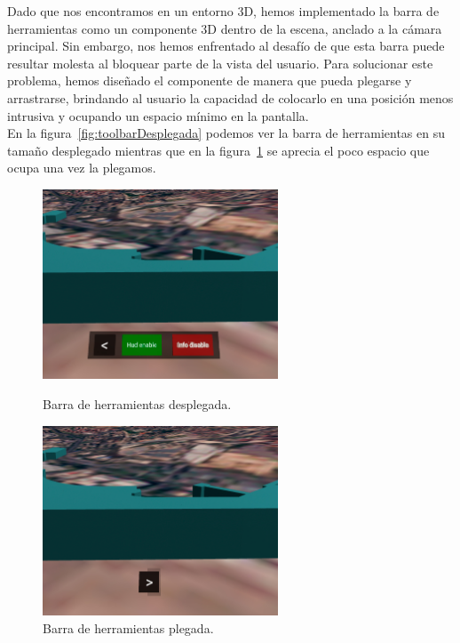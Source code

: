 \documentclass[a4paper, 11pt]{book}
\begin{document}
Dado que nos encontramos en un entorno 3D, hemos implementado la barra de herramientas como un componente 3D dentro de la escena, anclado a la cámara principal. Sin embargo, nos hemos enfrentado al desafío de que esta barra puede resultar molesta al bloquear parte de la vista del usuario. Para solucionar este problema, hemos diseñado el componente de manera que pueda plegarse y arrastrarse, brindando al usuario la capacidad de colocarlo en una posición menos intrusiva y ocupando un espacio mínimo en la pantalla.\\
En la figura~\ref{fig:toolbarDesplegada} podemos ver la barra de herramientas en su tamaño desplegado mientras que en la figura~\ref{fig:toolbarPlegada} se aprecia el poco espacio que ocupa una vez la plegamos.
\begin{figure}[h]
  \begin{minipage}[t]{0.5\linewidth}
    \centering
    \includegraphics[width=7cm, keepaspectratio]{img/toolbarAbierta.jpg}
    \caption{Barra de herramientas desplegada.}
    \label{fig:toolbarDesplegada}
  \end{minipage}%
  \begin{minipage}[t]{0.5\linewidth}
    \centering
    \includegraphics[width=7cm, keepaspectratio]{img/toolbarPlegada.jpg}
    \caption{Barra de herramientas plegada.}
    \label{fig:toolbarPlegada}    
  \end{minipage}
\end{figure}
\end{document}
